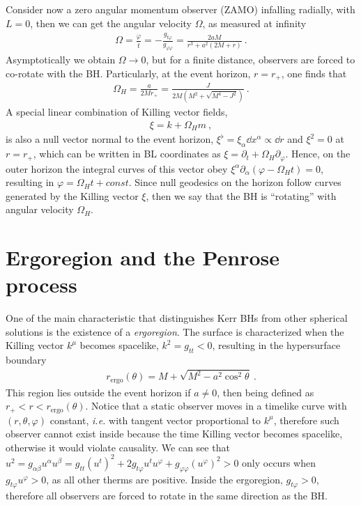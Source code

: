 Consider now a zero angular momentum observer (ZAMO) infalling radially, with $L=0$, then we can get the angular velocity $\Omega$, as measured at infinity
\begin{align}
    \Omega = \frac{\dot{\varphi}}{\dot{t}} = - \frac{g_{t\varphi}}{g_{\varphi\varphi}} = \frac{2 a M}{r^3 + a^2 (2 M+r)} ~.
    \label{eq2:angMomentumZAMO}
\end{align}
Asymptotically we obtain $\Omega\to0$, but for a finite distance, observers are forced to co-rotate with the BH. 
Particularly, at the event horizon, $r=r_+$, one finds that
\begin{align}
    \Omega_H = \frac{a}{2 M r_+} = \frac{J}{2 M \left(M^2+\sqrt{M^4-J^2}\right)} ~.
    \label{eq2:angMomentumH}
\end{align}
A special linear combination of Killing vector fields,
\begin{align}
    \xi = k + \Omega_H m ~,
    \label{eq2:KillingXi}
\end{align}
is also a null vector normal to the event horizon, $\xi^\flat=\xi_\alpha \dd x^\alpha \propto \dd r$ and $\xi^2 = 0$ at $r=r_+$, which can be written in BL coordinates as $\xi = \partial_t + \Omega_H \partial_\varphi$.
Hence, on the outer horizon the integral curves of this vector obey $\xi^\alpha \partial_\alpha (\varphi - \Omega_H t) = 0$, resulting in $\varphi = \Omega_H t + const$.
Since null geodesics on the horizon follow curves generated by the Killing vector $\xi$, then we say that the BH is ``rotating'' with angular velocity $\Omega_H$.

\section{Ergoregion and the Penrose process}

One of the main characteristic that distinguishes Kerr BHs from other spherical solutions is the existence of a \emph{ergoregion}.
The surface is characterized when the Killing vector $k^\mu$ becomes spacelike, $k^2=g_{tt}<0$, resulting in the hypersurface boundary
\begin{align}
    r_{\mathrm{ergo}}(\theta) = M + \sqrt{M^2 - a^2 \cos^2\theta} ~.
    \label{eq2:KerrErgo}
\end{align}
This region lies outside the event horizon if $a\ne0$, then being defined as $r_+< r < r_{\mathrm{ergo}}(\theta)$.
Notice that a static observer moves in a timelike curve with $(r,\theta,\varphi)$ constant, \emph{i.e.} with tangent vector proportional to $k^\mu$, therefore such observer cannot exist inside because the time Killing vector becomes spacelike, otherwise it would violate causality. We can see that $u^2=g_{\alpha\beta}u^\alpha u^\beta = g_{tt} (u^t)^2 + 2 g_{t\varphi} u^t u^\varphi +  g_{\varphi\varphi} (u^\varphi)^2 > 0$ only occurs when $g_{t\varphi} u^\varphi > 0$, as all other therms are positive. Inside the ergoregion, $g_{t\varphi}>0$, therefore all observers are forced to rotate in the same direction as the BH.

